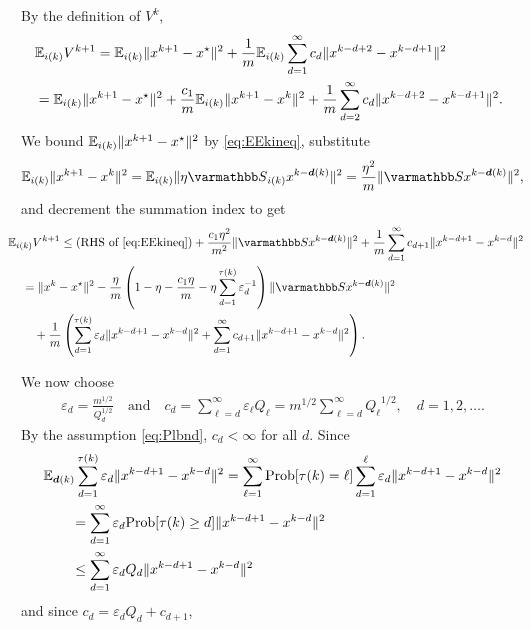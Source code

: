 \documentclass[10pt,mathserif]{beamer}
\begin{document}
\begin{frame}[plain]
By the definition of $V^k$,
\begin{align*}
  &\!\!\!{\mathbb{E}}_{i(k)} V^{k+1} = {\mathbb{E}}_{i(k)}\|x^{k+1} - x^\star\|^2 + \frac{1}{m}{\mathbb{E}}_{i(k)}\sum_{d=1}^{\infty}c_{d} \|x^{k-d+2}-x^{k-d+1}\|^2\\
  &\!\!\! = {\mathbb{E}}_{i(k)}\|x^{k+1} - x^\star\|^2 + \frac{c_1}{m}{\mathbb{E}}_{i(k)} \|x^{k+1}-x^{k}\|^2 + \frac{1}{m}\sum_{d=2}^{\infty}c_{d} \|x^{k-d+2}-x^{k-d+1}\|^2.
\end{align*}
We bound ${\mathbb{E}}_{i(k)}\|x^{k+1} - x^\star\|^2$ by \eqref{eq:EEkineq}, substitute
\[
\EE_{i(k)} \|x^{k+1}-x^{k}\|^2 = \EE_{i(k)} \|\eta \opS_{i(k)} x^{k-\vecdelay(k)}\|^2=\frac{\eta^2}{m}\|\opS x^{k-\vecdelay(k)}\|^2,
\]
and decrement the summation index to get
\begin{align*}
  &\!\!\!\!\!\!\!
\EE_{i(k)} V^{k+1} \le (\text{RHS of }\eqref{eq:EEkineq}) + \frac{c_1\eta^2}{m^2}\|\opS x^{k-\vecdelay(k)}\|^2 + \frac{1}{m}\sum_{d=1}^{\infty}c_{d+1} \|x^{k-d+1}-x^{k-d}\|^2\\
  &=\|x^k - x^\star\|^2 - 
 \frac{\eta}{m}\left(1-\eta -\frac{c_1\eta}{m}-\eta\sum_{d=1}^{{\tau}(k)}\varepsilon_d^{-1}\right)
  \|\opS x^{k-\vecdelay(k)}\|^2 \\
  &\quad+ \frac{1}{m}\left(\sum_{d=1}^{{\tau}(k)}\varepsilon_d\|x^{k-d+1}-x^{k-d}\|^2+\sum_{d=1}^{\infty}c_{d+1}\|x^{k-d+1}-x^{k-d}\|^2\right).
\end{align*}

\end{frame}


\begin{frame}[fragile]
We now choose
\begin{align*}
  \varepsilon_d = \frac{m^{1/2}}{ Q_d^{1/2}}\quad\text{and}\quad c_d = \sum_{\ell=d}^{\infty} \varepsilon_\ell Q_\ell = {m}^{1/2}\sum_{\ell=d}^{\infty} {Q_\ell}^{1/2},\quad d=1,2,\dots.
\end{align*}
By the assumption \eqref{eq:Plbnd}, $c_d <\infty$ for all $d$.
Since 
\begin{align*}
  &{\mathbb{E}}_{\boldsymbol{d}(k)} \sum_{d=1}^{{\tau}(k)}\varepsilon_d\|x^{k-d+1}-x^{k-d}\|^2 = \sum_{\ell=1}^{\infty}{\mathrm{Prob}}[\tau(k)=\ell]\sum_{d=1}^{\ell}\varepsilon_d \|x^{k-d+1}-x^{k-d}\|^2\\
  &\qquad =  \sum_{d=1}^{\infty} \varepsilon_d {\mathrm{Prob}}[\tau(k)\ge d]\|x^{k-d+1}-x^{k-d}\|^2\\
  &\qquad \le \sum_{d=1}^{\infty} \varepsilon_d Q_d\|x^{k-d+1}-x^{k-d}\|^2
\end{align*}
and since $c_d = \varepsilon_d Q_d + c_{d+1}$,
\end{frame}
\end{document}
